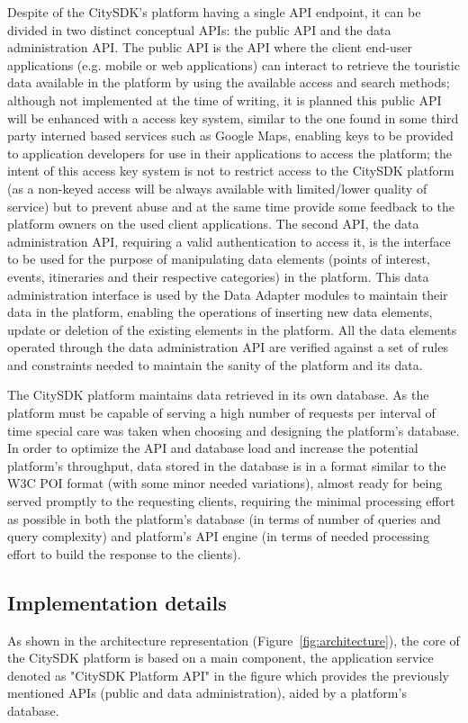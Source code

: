 \documentclass[times]{ettauth}
\begin{document}
Despite of the CitySDK's platform having a single API endpoint, it can be divided in two distinct conceptual APIs: the public API and the data administration API. The public API is the API where the client end-user applications (e.g. mobile or web applications) can interact to retrieve the touristic data available in the platform by using the available access and search methods; although not implemented at the time of writing, it is planned this public API will be enhanced with a access key system, similar to the one found in some third party interned based services such as Google Maps, enabling keys to be provided to application developers for use in their applications to access the platform; the intent of this access key system is not to restrict access to the CitySDK platform (as a non-keyed access will be always available with limited/lower quality of service) but to prevent abuse and at the same time provide some feedback to the platform owners on the used client applications. The second API, the data administration API, requiring a valid authentication to access it, is the interface to be used for the purpose of manipulating data elements (points of interest, events, itineraries and their respective categories) in the platform. This data administration interface is used by the Data Adapter modules to maintain their data in the platform, enabling the operations of inserting new data elements, update or deletion of the existing elements in the platform. All the data elements operated through the data administration API are verified against a set of rules and constraints needed to maintain the sanity of the platform and its data.

The CitySDK platform maintains data retrieved in its own database. As the platform must be capable of serving a high number of requests per interval of time special care was taken when choosing and designing the platform's database. In order to optimize the API and database load and increase the potential platform's throughput, data stored in the database is in a format similar to the W3C POI format (with some minor needed variations), almost ready for being served promptly to the requesting clients, requiring the minimal processing effort as possible in both the platform's database (in terms of number of queries and query complexity) and platform's API engine (in terms of needed processing effort to build the response to the clients).

\subsection{Implementation details}
As shown in the architecture representation (Figure~\ref{fig:architecture}), the core of the CitySDK platform is based on a main component, the application service denoted as "CitySDK Platform API" in the figure which provides the previously mentioned APIs (public and data administration), aided by a platform's database. 
\end{document}
